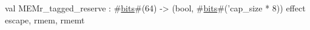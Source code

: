 val MEMr_tagged_reserve : #\hyperref[zbits]{bits}#(64) -> (bool, #\hyperref[zbits]{bits}#('cap_size * 8)) effect { escape, rmem, rmemt }
